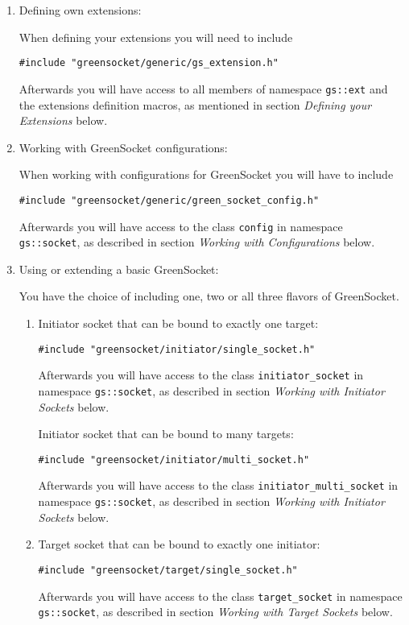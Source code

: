 \documentclass[a4paper,10pt]{article}          %
\begin{document}
\begin{enumerate}
\item 
Defining own extensions:

When defining your extensions you will need to include 

\verb|#include "greensocket/generic/gs_extension.h"|

Afterwards you will have access to all members of namespace \verb|gs::ext| and the extensions definition macros, as mentioned in section \emph{Defining your Extensions} below.

\item 
Working with GreenSocket configurations:

When working with configurations for GreenSocket you will have to include

\verb|#include "greensocket/generic/green_socket_config.h"|

Afterwards you will have access to the class \verb|config| in namespace \verb|gs::socket|, as described in section \emph{Working with Configurations} below.

\item 
Using or extending a basic GreenSocket:

You have the choice of including one, two or all three flavors of GreenSocket.
\begin{enumerate}
\item 
Initiator socket that can be bound to exactly one target:

\verb|#include "greensocket/initiator/single_socket.h"|

Afterwards you will have access to the class \verb|initiator_socket| in namespace \verb|gs::socket|, as described in section \emph{Working with Initiator Sockets} below.

Initiator socket that can be bound to many targets:

\verb|#include "greensocket/initiator/multi_socket.h"|

Afterwards you will have access to the class \verb|initiator_multi_socket| in namespace \verb|gs::socket|, as described in section \emph{Working with Initiator Sockets} below.

\item 
Target socket that can be bound to exactly one initiator:

\verb|#include "greensocket/target/single_socket.h"|

Afterwards you will have access to the class \verb|target_socket| in namespace \verb|gs::socket|, as described in section \emph{Working with Target Sockets} below.


\end{enumerate}
\end{enumerate}
\end{document}
